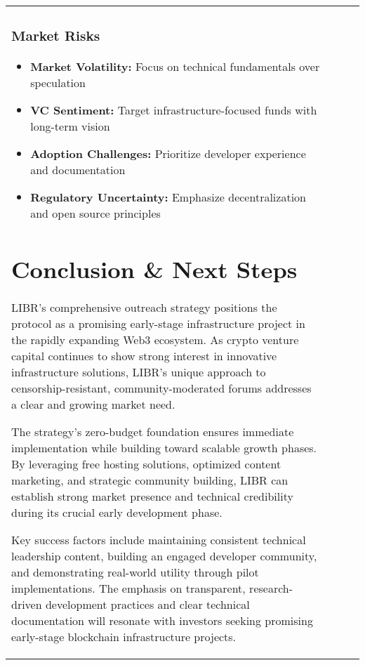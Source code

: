 \documentclass[12pt,a4paper]{article}
\begin{document}
\begin{center}
\begin{itemize}
\begin{enumerate}
\begin{itemize}
\begin{center}
\begin{tabular}{|l|l|l|l|}
\begin{center}
\begin{itemize}
\begin{itemize}
\subsubsection{Market Risks}
\begin{itemize}
    \item \textbf{Market Volatility:} Focus on technical fundamentals over speculation
    \item \textbf{VC Sentiment:} Target infrastructure-focused funds with long-term vision
    \item \textbf{Adoption Challenges:} Prioritize developer experience and documentation
    \item \textbf{Regulatory Uncertainty:} Emphasize decentralization and open source principles
\end{itemize}

\section{Conclusion \& Next Steps}

LIBR's comprehensive outreach strategy positions the protocol as a promising early-stage infrastructure project in the rapidly expanding Web3 ecosystem. As crypto venture capital continues to show strong interest in innovative infrastructure solutions, LIBR's unique approach to censorship-resistant, community-moderated forums addresses a clear and growing market need.

The strategy's zero-budget foundation ensures immediate implementation while building toward scalable growth phases. By leveraging free hosting solutions, optimized content marketing, and strategic community building, LIBR can establish strong market presence and technical credibility during its crucial early development phase.

Key success factors include maintaining consistent technical leadership content, building an engaged developer community, and demonstrating real-world utility through pilot implementations. The emphasis on transparent, research-driven development practices and clear technical documentation will resonate with investors seeking promising early-stage blockchain infrastructure projects.


\end{itemize}
\end{itemize}
\end{center}
\end{tabular}
\end{center}
\end{itemize}
\end{enumerate}
\end{itemize}
\end{center}
\end{document}
